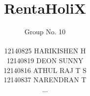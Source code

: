\documentclass[11pt]{report}
\begin{document}
\renewcommand\bibname{References}
\pagestyle{fancy}
\fancyhead{}
\fancyfoot{}
\fancyfoot[c]{\thepage}
\renewcommand{\chaptermark}[1]{
\markboth{\thechapter.\ #1}{}} 
\renewcommand{\headrulewidth}{0.3pt}
\fancyhead[r]{\slshape \leftmark}
\addtolength{\headheight}{\baselineskip}

\lhead{\nouppercase{\rightmark}}
\rhead{\nouppercase{\leftmark}}
%
\title {RentaHoliX}
\author{Group No. 10\\\\12140825 HARIKISHEN H\\ 12140819 DEON SUNNY\\ 12140816 ATHUL RAJ T S\\ 12140837 NARENDRAN T\\...\\}
\end{document}
